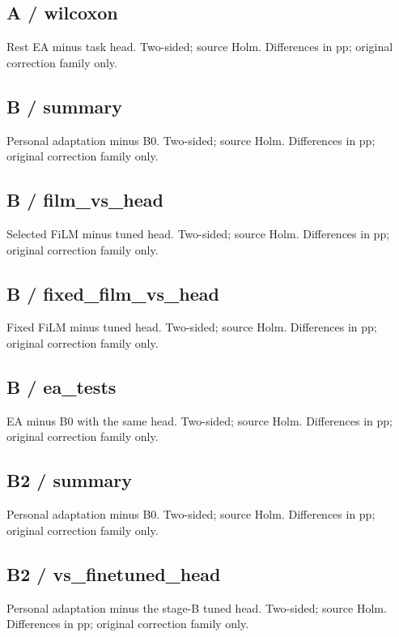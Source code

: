 \subsection*{A / wilcoxon}
Rest EA minus task head. Two-sided; source Holm. Differences in pp; original correction family only. 

\subsection*{B / summary}
Personal adaptation minus B0. Two-sided; source Holm. Differences in pp; original correction family only. 

\subsection*{B / film\_\allowbreak{}vs\_\allowbreak{}head}
Selected FiLM minus tuned head. Two-sided; source Holm. Differences in pp; original correction family only. 

\subsection*{B / fixed\_\allowbreak{}film\_\allowbreak{}vs\_\allowbreak{}head}
Fixed FiLM minus tuned head. Two-sided; source Holm. Differences in pp; original correction family only. 

\subsection*{B / ea\_\allowbreak{}tests}
EA minus B0 with the same head. Two-sided; source Holm. Differences in pp; original correction family only. 

\subsection*{B2 / summary}
Personal adaptation minus B0. Two-sided; source Holm. Differences in pp; original correction family only. 

\subsection*{B2 / vs\_\allowbreak{}finetuned\_\allowbreak{}head}
Personal adaptation minus the stage-B tuned head. Two-sided; source Holm. Differences in pp; original correction family only. 

